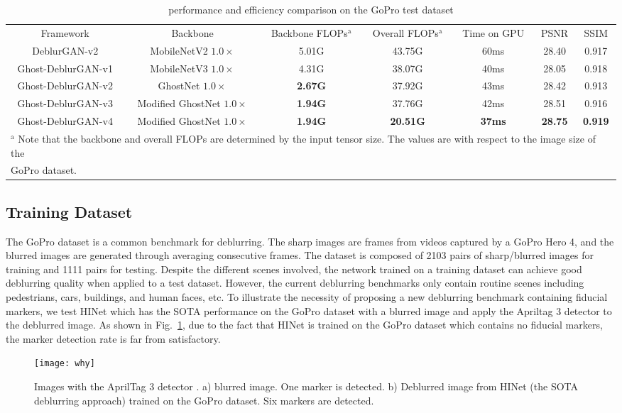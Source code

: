 \documentclass[letterpaper, 10 pt, conference]{ieeeconf}
\begin{document}
\begin{table*}[htbp]
\caption{performance and efficiency comparison on the GoPro test dataset}
\begin{center}
\begin{tabular}{c|c|c|c|c|c|c}
\hline\hline
Framework & Backbone&Backbone FLOPs$^{\mathrm{a}}$ &Overall FLOPs$^{\mathrm{a}}$&Time on GPU &  PSNR &  SSIM   \\
\cline{1-7} 
DeblurGAN-v2 \cite{deblurgan2} & MobileNetV2 $1.0\times$ & 5.01G &43.75G& 60ms&  28.40 &  0.917 \\ \hline
Ghost-DeblurGAN-v1& MobileNetV3 $1.0\times$ & 4.31G &38.07G& 40ms& 28.05 & 0.918 \\ \hline
Ghost-DeblurGAN-v2&GhostNet  $1.0\times$ & \textbf{2.67G} &37.92G& 43ms& 28.42 &  0.913 \\ \hline
Ghost-DeblurGAN-v3&Modified GhostNet  $1.0\times$ & \textbf{1.94G} &37.76G& 42ms& 28.51 &  0.916 \\ \hline
Ghost-DeblurGAN-v4&Modified GhostNet  $1.0\times$& \textbf{1.94G} &\textbf{20.51G}& \textbf{37ms}&  \textbf{28.75} &  \textbf{0.919} \\ \hline\hline
\multicolumn{7}{l}{$^{\mathrm{a}}$ Note that the backbone and overall FLOPs are determined by the input tensor size. The values are with respect to the image size of the} \\
\multicolumn{7}{l}{GoPro dataset.}
\end{tabular}
\label{tab1}
\end{center}
\end{table*}



\subsection{Training Dataset}
The GoPro dataset \cite{nah} is a common benchmark for deblurring. The sharp images are frames from videos captured by a GoPro Hero 4, and the blurred images are generated through averaging consecutive frames. The dataset is composed of 2103 pairs of sharp/blurred images for training and 1111 pairs for testing. Despite the different scenes involved, the network trained on a training dataset can achieve good deblurring quality when applied to a test dataset. However, the current deblurring benchmarks only contain routine scenes including pedestrians, cars, buildings, and human faces, etc. To illustrate the necessity of proposing a new deblurring benchmark containing fiducial markers, we test HINet \cite{chen2021hinet} which has the SOTA performance on the GoPro dataset with a blurred image and apply the Apriltag 3 detector \cite{ap3} to the deblurred image. As shown in Fig.~\ref{why}, due to the fact that HINet is trained on the GoPro dataset which contains no fiducial markers, the marker detection rate is far from  satisfactory.
\begin{figure}[thpb]
	\centering
	\texttt{[image: why]}
\caption{Images with the AprilTag 3 detector \cite{ap3}. a) blurred image. One marker is detected. b) Deblurred image from HINet \cite{chen2021hinet} (the SOTA deblurring approach) trained on the GoPro dataset. Six markers are detected.}
	\label{why}
\end{figure}
\end{document}
